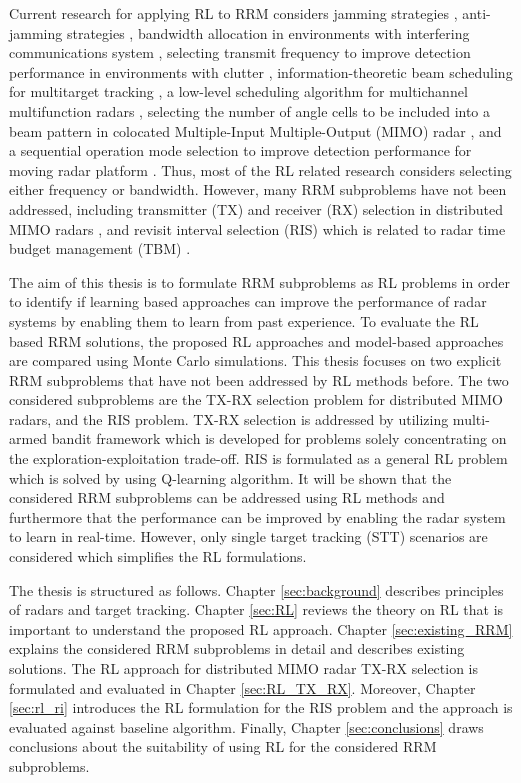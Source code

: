 \documentclass[english, 12pt, a4paper, elec, utf8, a-1b, online]{aaltothesis}
\begin{document}
Current research for applying RL to RRM considers
jamming strategies \cite{Qiang2017, Wang2019, Wang2019a, Zhang2019},
anti-jamming strategies \cite{Kang2018, Ak2019}, 
bandwidth allocation in environments with interfering communications system \cite{Selvi2018, Kozy2019},
selecting transmit frequency to improve detection performance in environments with clutter \cite{Wabeke2010}, 
information-theoretic beam scheduling for multitarget tracking \cite{Kreucher2005, Xu2010},
a low-level scheduling algorithm for multichannel multifunction radars \cite{Shaghaghi2018},
selecting the number of angle cells to be included into a beam pattern in colocated Multiple-Input Multiple-Output (MIMO) radar \cite{Wang2018}, 
and a sequential operation mode selection to improve detection performance for moving radar platform \cite{Smits2008}.
Thus, most of the RL related research considers selecting  either frequency or bandwidth. 
However, many RRM subproblems have not been addressed, including transmitter (TX) and receiver (RX) selection in distributed MIMO radars \cite{Godrich2011a, Godrich2011, Sun2014}, and revisit interval selection (RIS) which is related to radar time budget management (TBM) \cite{Cohen1986, Gardner1988, Munu1992, ChengTing2007, Baek2010, Watson1993, Charlish2015, Keuk1975, Shin1995, Benoudnine2006, Esfahani2012, Zamani2017, Christiansen2018, Pilte2018}.

The aim of this thesis is to formulate RRM subproblems as RL problems in order to identify if learning based approaches can improve the performance of radar systems by enabling them to learn from past experience. 
To evaluate the RL based RRM solutions, the proposed RL approaches and model-based approaches are compared using Monte Carlo simulations. 
This thesis focuses on two explicit RRM subproblems that have not been addressed by RL methods before. 
The two considered subproblems are the TX-RX selection problem for distributed MIMO radars, and the RIS problem.
TX-RX selection is addressed by utilizing multi-armed bandit framework which is developed for problems solely concentrating on the exploration-exploitation trade-off. 
RIS is formulated as a general RL problem which is solved by using Q-learning algorithm.
It will be shown that the considered RRM subproblems can be addressed using RL methods and furthermore that the performance can be improved by enabling the radar system to learn in real-time.
However, only single target tracking (STT) scenarios are considered which simplifies the RL formulations. 

The thesis is structured as follows. Chapter \ref{sec:background} describes principles of radars and target tracking. Chapter \ref{sec:RL} reviews the theory on RL that is important to understand the proposed RL approach. 
Chapter \ref{sec:existing_RRM} explains the considered RRM subproblems in detail and describes existing solutions.
The RL approach for distributed MIMO radar TX-RX selection is formulated and evaluated in Chapter \ref{sec:RL_TX_RX}. Moreover,  Chapter \ref{sec:rl_ri} introduces the RL formulation for the RIS problem and the approach is evaluated against baseline algorithm. 
Finally, Chapter \ref{sec:conclusions} draws conclusions about the suitability of using RL for the considered RRM subproblems. 
\end{document}
